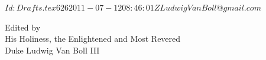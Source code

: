 \documentclass[11pt, a4paper, chordbk]{../SSSongbook}
\begin{document}
\svnInfo $Id: Drafts.tex 626 2011-07-12 08:46:01Z LudwigVanBoll@gmail.com $
\let\cleardoublepage\clearpage %

  {Edited by\\
    His Holiness, the Enlightened and Most Revered\\
    Duke Ludwig Van Boll III}

\tableofcontents %
\pagebreak

\smallchords



\printindex
\end{document}
